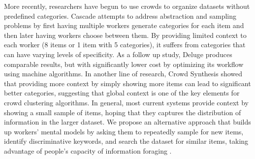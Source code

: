 % 



More recently, researchers have begun to use crowds to organize datasets without predefined categories.
Cascade \cite{chilton2013cascade}
attempts to address abstraction and sampling problems by first having
multiple workers generate categories for each item and then later having
workers choose between them. By providing limited context to each worker (8 items or 1 item with 5 categories), it suffers from 
categories that can have varying levels of specificity. As a follow up study, Deluge \cite{bragg2013crowdsourcing} produces
comparable results, but with significantly lower cost by optimizing
its workflow using machine algorithms. In another line of research, Crowd Synthesis \cite{andre2014crowd} showed that providing more context by simply showing more items can lead to significant better categories, suggesting that global context is one of the key elements for crowd clustering algorithms.
In general, most current systems provide context by showing a small sample of items, hoping that they captures the distribution of information in the larger dataset. 
We propose an alternative approach that builds up workers' mental models by asking them to repeatedly sample for new items, identify discriminative keywords, and search the dataset for similar items, taking advantage of people's capacity of information foraging \cite{pirolli1999information}.

